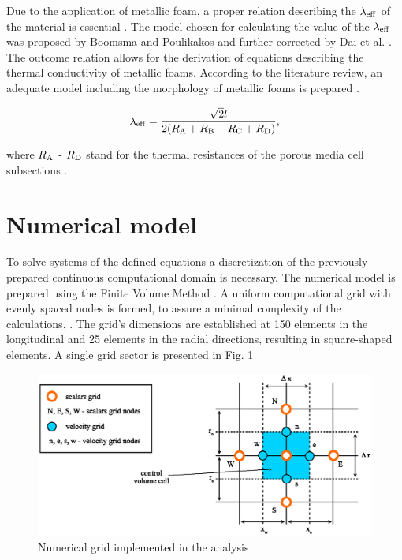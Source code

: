 \documentclass[preprint,12pt]{elsarticle}
\begin{document}
\vspace{3mm}

Due to the application of metallic foam, a proper relation describing the $\lambda_{\rm{eff}}$ of the material is essential \cite{Bhattacharya2002}.  The model chosen for calculating the value of the $\lambda_{\rm{eff}}$ was proposed by Boomsma and Poulikakos and further corrected by Dai et al. \cite{Boomsma2001, Dai2010}. The outcome relation allows for the derivation of equations describing the thermal conductivity of metallic foams. According to the literature review, an adequate model including the morphology of metallic foams is prepared \cite{Pajak2021IJHEa}.
 
\begin{equation}
\label{eq:eff_cond} 
\lambda_{\rm{eff}}=\frac{\sqrt{2}l}{2(R_{\rm{A}}+R_{\rm{B}}+R_{\rm{C}}+R_{\rm{D}})},
\end{equation}

\vspace{3mm}
\noindent where $R_{\rm{A}}$ - $R_{\rm{D}}$ stand for the thermal resistances of the porous media cell subsections \cite{Pajak2018, Dai2010}.


\section{Numerical model}
\label{sec:num_model}

To solve systems of the defined equations a discretization of the previously prepared continuous computational domain is necessary. The numerical model is prepared using the Finite Volume Method \cite{Moukalled2016}.  A uniform computational grid with evenly spaced nodes is formed, to assure a minimal complexity of the calculations, \cite{Kaw2011}. The grid's dimensions are established at 150 elements in the longitudinal and 25 elements in the radial directions, resulting in square-shaped elements. A single grid sector is presented in Fig. \ref{fig:grid} 

\begin{figure}[h]
\centering
\includegraphics[width=180mm]{grid.eps}\hspace{2pc} 
\caption{\label{fig:grid} Numerical grid implemented in the analysis}
\end{figure}
\end{document}
